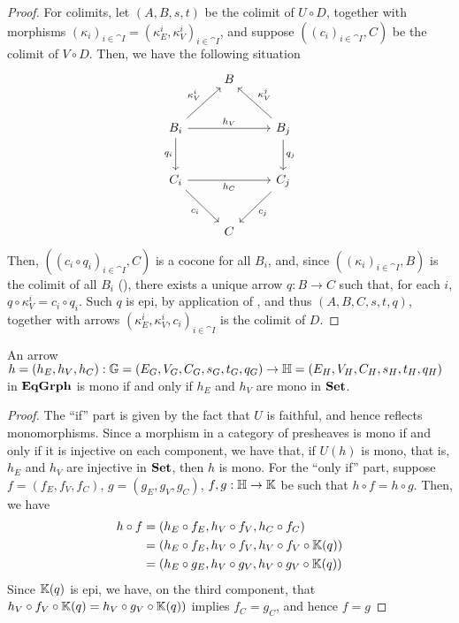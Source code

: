 \begin{proof}
     For colimits, let $(A, B, s, t)$ be the colimit of $U \circ D$, together with morphisms $(\kappa_i)_{i \in \cat I} = (\kappa_E^i, \kappa_V^i)_{i \in \cat I}$, and suppose $((c_i)_{i \in \cat I}, C)$ be the colimit of $V \circ D$. Then, we have the following situation
     \[
	     \begin{tikzcd}[row sep = 25, column sep=25]
			& B & \\
			B_i \ar[rr, "{h_V}"] \ar[ur, "{\kappa_V^i}"] \ar[d, "{q_i}"swap] & & B_j \ar[ul, "{\kappa_V^j}"swap] \ar[d, "q_j"] \\
			C_i \ar[rr, "{h_C}" swap] \ar[dr, "{c_i}"swap] & & C_j \ar[dl, "{c_j}"] \\
			& C &
		\end{tikzcd}
     \]
     Then, $((c_i \circ q_i)_{i \in \cat I}, C)$ is a cocone for all $B_i$, and, since $((\kappa_i)_{i \in \cat I}, B)$ is the colimit of all $B_i$ (), there exists a unique arrow $q: B \to C$ such that, for each $i$, $q \circ \kappa_V^i = c_i \circ q_i$. Such $q$ is epi, by application of , and thus $(A, B, C, s, t, q)$, together with arrows $(\kappa_E^i, \kappa_V^i, c_i)_{i \in \cat I}$ is the colimit of $D$.

\end{proof}

\begin{cor}\label{cor:mono_in_EqGrph}
    An arrow $h = (h_E, h_V, h_C): \mathbb{G} = (E_G, V_G, C_G, s_G, t_G, q_G) \to \mathbb{H} = (E_H, V_H, C_H, s_H, t_H, q_H)$ in $\mathbf{EqGrph}$ is mono if and only if $h_E$ and $h_V$ are mono in $\mathbf{Set}$.
\end{cor}

\begin{proof}
    The ``if'' part is given by the fact that $U$ is faithful, and hence reflects monomorphisms. Since a morphism in a category of presheaves is mono if and only if it is injective on each component, we have that, if  $U(h)$ is mono, that is, $h_E$ and $h_V$ are injective in $\mathbf{Set}$, then $h$ is mono.
    For the ``only if'' part, suppose $f = (f_E, f_V, f_C)$, $g=(g_E, g_V, g_C)$, $f, g : \mathbb{H \to K}$ be such that $h \circ f = h \circ g$. Then, we have
    \begin{align*}
        h \circ f   &= (h_E \circ f_E, h_V \circ f_V, h_C \circ f_C) \\
                    &= (h_E \circ f_E, h_V \circ f_V, h_V \circ f_V \circ \mathbb{K}(q)) \\
                    &= (h_E \circ g_E, h_V \circ g_V, h_V \circ g_V \circ \mathbb{K}(q))
    \end{align*}    
    Since $\mathbb{K}(q)$ is epi, we have, on the third component, that $h_V \circ f_V \circ \mathbb{K}(q) = h_V \circ g_V \circ \mathbb{K}(q))$ implies $f_C = g_C$, and hence $f = g$    
\end{proof}


